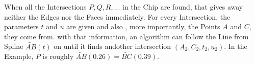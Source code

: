     When all the Intersections $P, Q, R, ...$ in the Chip are found, that gives away neither the Edges nor the Faces immediately. For every Intersection, the parameters $t$ and $u$ are given and also , more importantly, the Points $A$ and $C$, they come from. with that information, an algorithm can follow the Line from Spline $\widetilde{AB}(t)$ on until it finds andother intersection $(A_2, C_2, t_2, u_2)$. In the Example, $P$ is roughly $\widetilde{AB}(0.26) = \widetilde{BC}(0.39)$.
